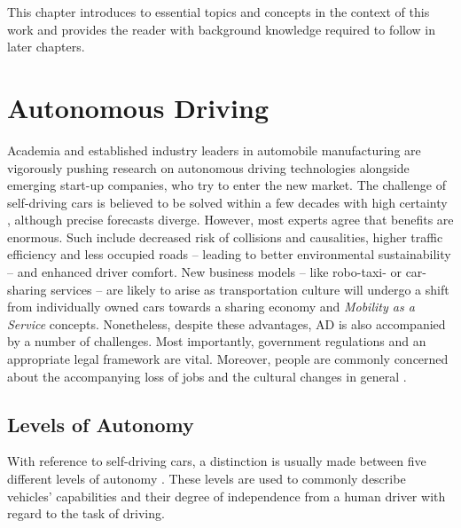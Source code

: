 This chapter introduces to essential topics and concepts in the context of this work and provides the reader with background knowledge required to follow in later chapters.

\section{Autonomous Driving}
\label{sec:background:autonomous_driving}
Academia and established industry leaders in automobile manufacturing are vigorously pushing research on autonomous driving technologies alongside emerging start-up companies, who try to enter the new market. The challenge of self-driving cars is believed to be solved within a few decades with high certainty \cite{Frost&SulivanConsulting2018}, although precise forecasts diverge. However, most experts agree that benefits are enormous. Such include decreased risk of collisions and causalities, higher traffic efficiency and less occupied roads – leading to better environmental sustainability – and enhanced driver comfort. New business models – like robo-taxi- or car-sharing services – are likely to arise as transportation culture will undergo a shift from individually owned cars towards a sharing economy and \textit{Mobility as a Service} concepts. Nonetheless, despite these advantages, AD is also accompanied by a number of challenges. Most importantly, government regulations and an appropriate legal framework are vital. Moreover, people are commonly concerned about the accompanying loss of jobs and the cultural changes in general \cite{schoettle2014survey}. 

\subsection{Levels of Autonomy}
\label{subsec:background:labels_of_autonomy}
With reference to self-driving cars, a distinction is usually made between five different levels of autonomy \cite{Klein}. These levels are used to commonly describe vehicles' capabilities and their degree of independence from a human driver with regard to the task of driving. 

